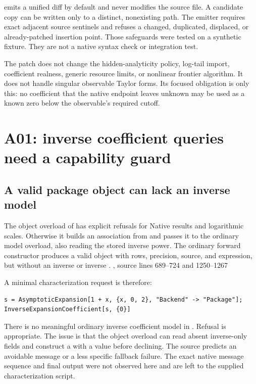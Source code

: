 \documentclass[11pt,letterpaper]{article}
\newcommand{\src}[2]{\cite{#1}, source lines #2}
\theoremstyle{definition}\newtheorem{definition}[proposition]{Definition}
\begin{document}
 emits a unified diff by default and never
modifies the source file. A candidate copy can be written only to a distinct,
nonexisting path. The emitter requires exact adjacent source sentinels and
refuses a changed, duplicated, displaced, or already-patched insertion point.
Those safeguards were tested on a synthetic fixture. They are not a native
syntax check or integration test.

The patch does not change the hidden-analyticity policy, log-tail import,
coefficient realness, generic resource limits, or nonlinear frontier algorithm.
It does not handle singular observable Taylor forms. Its focused obligation
is only this: no coefficient that the native endpoint leaves unknown may be
used as a known zero below the observable's required cutoff.

\section{A01: inverse coefficient queries need a capability guard}
\subsection{A valid package object can lack an inverse model}
The object overload of  has explicit refusals
for Native results and logarithmic scales. Otherwise it builds an association
from  and passes it to the ordinary model overload, also reading
the stored inverse power. The ordinary forward constructor produces a valid
 object with rows, precision, source, and expression,
but without an inverse  or inverse .
\src{core}{689--724 and 1250--1267}

\begin{minipage}{\linewidth}
A minimal characterization request is therefore:
\begin{lstlisting}
s = AsymptoticExpansion[1 + x, {x, 0, 2}, "Backend" -> "Package"];
InverseExpansionCoefficient[s, {0}]
\end{lstlisting}
\end{minipage}

There is no meaningful ordinary inverse coefficient model in . Refusal
is appropriate. The issue is that the object overload can read absent
inverse-only fields and construct a  with a  value
before declining. The source predicts an avoidable message or a less specific
fallback failure. The exact native message sequence and final output were not
observed here and are left to the supplied characterization script.
\end{document}
